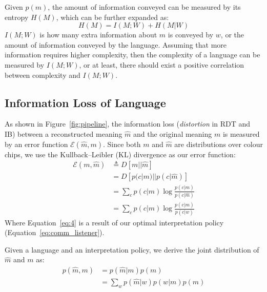 \documentclass[11pt]{article}
\begin{document}
Given $p(m)$, the amount of information conveyed can be measured by its entropy $H(M)$, which can be further expanded as:
\begin{equation}
    H(M)=I(M;W)+H(M|W) 
\end{equation}
$I(M;W)$ is how many extra information about $m$ is conveyed by $w$, or the amount of information conveyed by the language.
Assuming that more information requires higher complexity, then the complexity of a language can be measured by $I(M;W)$, or at least, there should exist a positive correlation between complexity and $I(M;W)$.

\subsection{Information Loss of Language}
As shown in Figure~\ref{fig:pipeline}, the information loss (\emph{distortion} in RDT and IB) between a reconstructed meaning $\hat{m}$ and the original meaning $m$ is measured by an error function $\mathcal{E}(\hat{m}, m)$.
Since both $m$ and $\hat{m}$ are distributions over colour chips, we use the Kullback–Leibler (KL) divergence as our error function:
\begin{align}
    \mathcal{E}(m,\hat{m}) &\triangleq  D[m||\hat{m}] \label{eq:1}\\
    & = D[p(c|m)||p(c|\hat{m})]  \label{eq:2}\\
    & = \sum_{c} p(c|m) \log \frac{p(c|m)}{p(c|\hat{m})} \label{eq:3}\\
    & = \sum_{c} p(c|m) \log \frac{p(c|m)}{p(c|w)} \label{eq:4}
\end{align}
Where Equation~\ref{eq:4} is a result of our optimal interpretation policy (Equation~\ref{eq:comm_listener}). 

Given a language and an interpretation policy, we derive the joint distribution of $\hat{m}$ and $m$ as:
\begin{equation}
    \begin{split}
        p(\hat{m},m) 
        & = p(\hat{m}|m)p(m) \\
        & = \sum_w p(\hat{m}|w)p(w|m)p(m)
    \end{split}
    \label{eq:joint_c_hat_c}
\end{equation}
\end{document}
